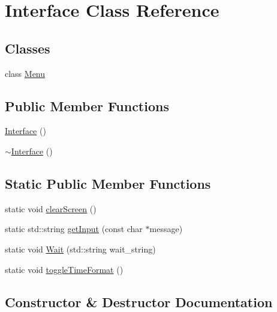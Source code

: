 \hypertarget{class_interface}{}\section{Interface Class Reference}
\label{class_interface}
\subsection*{Classes}
\begin{DoxyCompactItemize}
\item 
class \mbox{\hyperlink{class_interface_1_1_menu}{Menu}}
\end{DoxyCompactItemize}
\subsection*{Public Member Functions}
\begin{DoxyCompactItemize}
\item 
\mbox{\hyperlink{class_interface_a4406d74c75bdfe150bf72be1f1cda8b1}{Interface}} ()
\item 
\mbox{\hyperlink{class_interface_a19179888f29f18f1be54a3dfe98f68c0}{$\sim$\+Interface}} ()
\end{DoxyCompactItemize}
\subsection*{Static Public Member Functions}
\begin{DoxyCompactItemize}
\item 
static void \mbox{\hyperlink{class_interface_af92bb2aeecc6a19095af23fa78b49451}{clear\+Screen}} ()
\item 
static std\+::string \mbox{\hyperlink{class_interface_aa5c0539404373d488986f030f7a84a6f}{get\+Input}} (const char $\ast$message)
\item 
static void \mbox{\hyperlink{class_interface_ab235ba2f0184e3fbfd5d5a64d5eb85ef}{Wait}} (std\+::string wait\+\_\+string)
\item 
static void \mbox{\hyperlink{class_interface_a2e002e61dc11cf4a1bd9c039704194df}{toggle\+Time\+Format}} ()
\end{DoxyCompactItemize}


\subsection{Constructor \& Destructor Documentation}
\mbox{\label{class_interface_a4406d74c75bdfe150bf72be1f1cda8b1}} 
